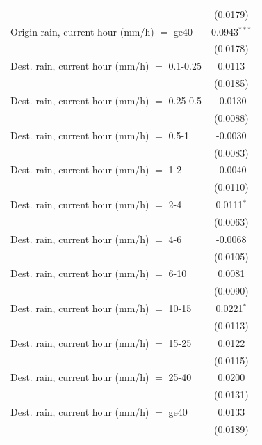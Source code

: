 \begin{tabular}{lc}
                                                 & (0.0179)\\   
   Origin rain, current hour (mm/h) $=$ ge40     & 0.0943$^{***}$\\   
                                                 & (0.0178)\\   
   Dest. rain, current hour (mm/h) $=$ 0.1-0.25  & 0.0113\\   
                                                 & (0.0185)\\   
   Dest. rain, current hour (mm/h) $=$ 0.25-0.5  & -0.0130\\   
                                                 & (0.0088)\\   
   Dest. rain, current hour (mm/h) $=$ 0.5-1     & -0.0030\\   
                                                 & (0.0083)\\   
   Dest. rain, current hour (mm/h) $=$ 1-2       & -0.0040\\   
                                                 & (0.0110)\\   
   Dest. rain, current hour (mm/h) $=$ 2-4       & 0.0111$^{*}$\\   
                                                 & (0.0063)\\   
   Dest. rain, current hour (mm/h) $=$ 4-6       & -0.0068\\   
                                                 & (0.0105)\\   
   Dest. rain, current hour (mm/h) $=$ 6-10      & 0.0081\\   
                                                 & (0.0090)\\   
   Dest. rain, current hour (mm/h) $=$ 10-15     & 0.0221$^{*}$\\   
                                                 & (0.0113)\\   
   Dest. rain, current hour (mm/h) $=$ 15-25     & 0.0122\\   
                                                 & (0.0115)\\   
   Dest. rain, current hour (mm/h) $=$ 25-40     & 0.0200\\   
                                                 & (0.0131)\\   
   Dest. rain, current hour (mm/h) $=$ ge40      & 0.0133\\   
                                                 & (0.0189)\\   

\end{tabular}
